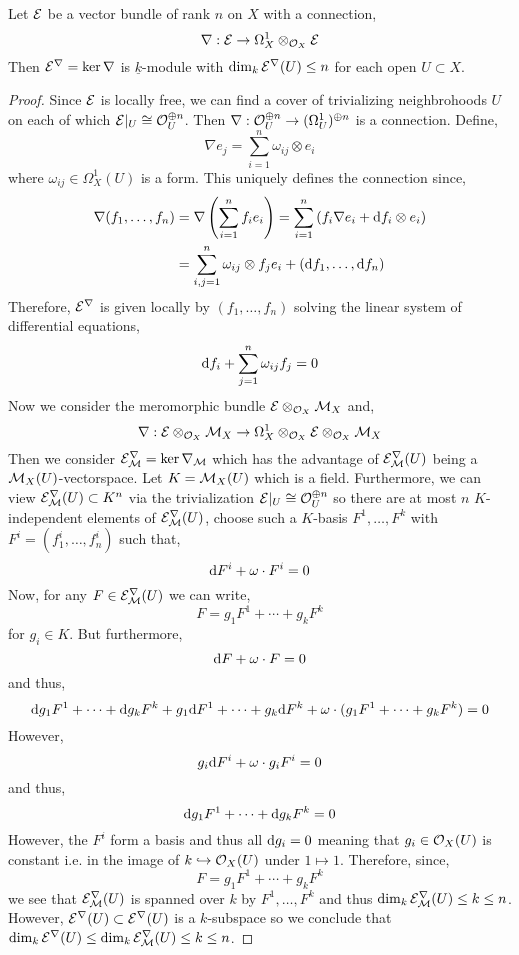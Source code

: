 \documentclass[12pt]{article}
\begin{document}
\begin{prop}
Let $\mathcal{E}$ be a vector bundle of rank $n$ on $X$ with a connection,
\[ \nabla : \mathcal{E} \to \Omega^1_X \otimes_{\mathcal{O}_{X}} \mathcal{E} \]
Then $\mathcal{E}^\nabla = \ker{\nabla}$ is $\underline{k}$-module with $\dim_k \mathcal{E}^\nabla(U) \le n$ for each open $U \subset X$. 
\end{prop}

\begin{proof}
Since $\mathcal{E}$ is locally free, we can find a cover of trivializing neighbrohoods $U$ on each of which $\mathcal{E}|_U \cong \mathcal{O}_{U}^{\oplus n}$. Then $\nabla : \mathcal{O}_{U}^{\oplus n} \to (\Omega^1_U)^{\oplus n}$ is a connection. Define,
\[ \nabla e_j = \sum_{i = 1}^n \omega_{ij} \otimes e_i  \]
where $\omega_{ij} \in \Omega_X^1(U)$ is a form.
This uniquely defines the connection since,
\begin{align*}
\nabla (f_1, \dots, f_n) & = \nabla \left( \sum_{i = 1}^n f_i e_i \right) = \sum_{i = 1}^n \left( f_i \nabla e_i + \mathrm{d}{f_i} \otimes e_i \right)
\\
& = \sum_{i,j = 1}^n \omega_{ij} \otimes f_j e_i + (\mathrm{d}{f_1}, \dots, \mathrm{d}{f_n})
\end{align*}
Therefore, $\mathcal{E}^\nabla$ is given locally by $(f_1, \dots, f_n)$ solving the linear system of differential equations,
\[ \mathrm{d}{f_i} + \sum_{j = 1}^n \omega_{ij} f_j = 0 \]
Now we consider the meromorphic bundle $\mathcal{E} \otimes_{\mathcal{O}_{X}} \mathcal{M}_X$ and,
\[ \nabla : \mathcal{E} \otimes_{\mathcal{O}_{X}} \mathcal{M}_X \to \Omega^1_X \otimes_{\mathcal{O}_{X}} \mathcal{E} \otimes_{\mathcal{O}_{X}} \mathcal{M}_X \]
Then we consider $\mathcal{E}^\nabla_{\mathcal{M}} = \ker{\nabla_{\mathcal{M}}}$ which has the advantage of $\mathcal{E}^\nabla_{\mathcal{M}}(U)$ being a $\mathcal{M}_X(U)$-vectorspace. Let $K = \mathcal{M}_X(U)$ which is a field. Furthermore, we can view $\mathcal{E}^\nabla_{\mathcal{M}}(U) \subset K^n$ via the trivialization $\mathcal{E}|_U \cong \mathcal{O}_{U}^{\oplus n}$ so there are at most $n$ $K$-independent elements of $\mathcal{E}_{\mathcal{M}}^\nabla(U)$, choose such a $K$-basis $F^1, \dots, F^k$ with $F^i = (f^i_1, \dots, f^i_n)$ such that,
\[ \mathrm{d}{F^i} + \omega \cdot F^i = 0 \]
Now, for any $F \in \mathcal{E}^\nabla_{\mathcal{M}}(U)$ we can write,
\[ F = g_1 F^1 + \cdots + g_k F^k \]
for $g_i \in K$. But furthermore,
\[ \mathrm{d}{F} + \omega \cdot F = 0 \]
and thus,
\[ \mathrm{d}{g_1} F^1 + \cdots + \mathrm{d}{g_k} F^k + g_1 \mathrm{d}{F^1} + \cdots + g_k \mathrm{d}{F^k} + \omega \cdot (g_1 F^1 + \cdots + g_k F^k) = 0 \]
However,
\[ g_i \mathrm{d}{F^i} + \omega \cdot g_i F^i = 0 \]
and thus, 
\[ \mathrm{d}{g_1} F^1 + \cdots + \mathrm{d}{g_k} F^k = 0 \]
However, the $F^i$ form a basis and thus all $\mathrm{d}{g_i} = 0$ meaning that $g_i \in \mathcal{O}_{X}(U)$ is constant i.e. in the image of $k \hookrightarrow \mathcal{O}_{X}(U)$ under $1 \mapsto 1$. Therefore, since,
\[ F = g_1 F^1 + \cdots + g_k F^k \]
we see that $\mathcal{E}^\nabla_{\mathcal{M}}(U)$ is spanned over $k$ by $F^1, \dots, F^k$ and thus $\dim_k \mathcal{E}^\nabla_{\mathcal{M}}(U) \le k \le n$. However, $\mathcal{E}^\nabla(U) \subset \mathcal{E}^\nabla(U)$ is a $k$-subspace so we conclude that $\dim_k \mathcal{E}^\nabla(U) \le \dim_k \mathcal{E}^\nabla_{\mathcal{M}}(U) \le k \le n$.
\end{proof}
\end{document}
